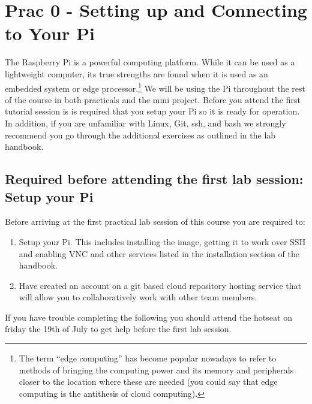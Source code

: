 \setcounter{section}{-1}
\section{Prac 0 - Setting up and Connecting to Your Pi}
The Raspberry Pi is a powerful computing platform. While it can be used as a lightweight computer, its true strengths are found when it is used as an embedded system or edge processor.\footnote{The term “edge computing” has become popular nowadays to refer to methods of bringing the computing power and its memory and peripherals closer to the location where these are needed (you could say that edge computing is the antithesis of cloud computing).}  We will be using the Pi throughout the rest of the course in both practicals and the mini project.  Before you attend the first tutorial session is is required that you setup your Pi so it is ready for operation.  In addition, if you are unfamiliar with Linux, Git, ssh, and bash we strongly recommend you go through the additional exercises as outlined in the lab handbook.

\subsection{Required before attending the first lab session: Setup your Pi }
Before arriving at the first practical lab session of this course you are required to:
\begin{enumerate}
    \item Setup your Pi. This includes installing the image, getting it to work over SSH and enabling VNC and other services listed in the installation section of the handbook.
    \item Have created an account on a git based cloud repository hosting service that will allow you to collaboratively work with other team members.
\end{enumerate}

If you have trouble completing the following you should attend the hotseat on friday the 19th of July to get help before the first lab session.
